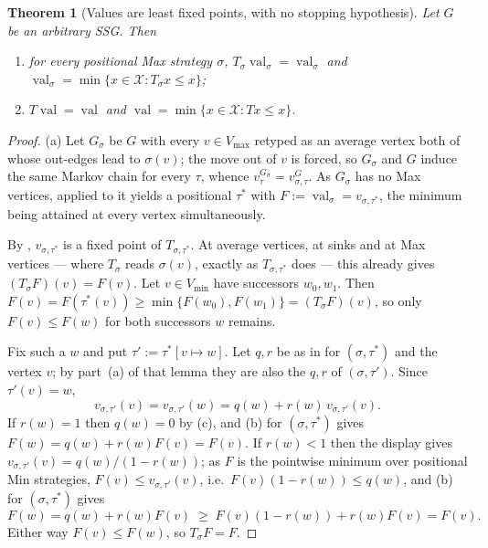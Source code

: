 \documentclass[11pt]{article}
\theoremstyle{plain}
\newtheorem{theorem}{Theorem}[section]
\theoremstyle{definition}
\DeclareMathOperator{\val}{val}
\newcommand{\Vmax}{V_{\max}}
\newcommand{\Vmin}{V_{\min}}
\begin{document}
\begin{theorem}[Values are least fixed points, with no stopping hypothesis]\label{thm:lfp-general}
Let $G$ be an arbitrary SSG. Then
\begin{enumerate}[label=(\alph*),leftmargin=2.2em]
\item for every positional Max strategy $\sigma$,
  $T_\sigma\val_\sigma=\val_\sigma$ and
  $\val_\sigma=\min\{x\in\mathcal{X}:T_\sigma x\le x\}$;
\item $T\val=\val$ and $\val=\min\{x\in\mathcal{X}:Tx\le x\}$.
\end{enumerate}
\end{theorem}

\begin{proof}
(a) Let $G_\sigma$ be $G$ with every $v\in\Vmax$ retyped as an average
vertex both of whose out-edges lead to $\sigma(v)$; the move out of $v$
is forced, so $G_\sigma$ and $G$ induce the same Markov chain for every
$\tau$, whence $v^{G_\sigma}_\tau=v^{G}_{\sigma,\tau}$. As $G_\sigma$ has
no Max vertices,  applied to it yields a positional
$\tau^\ast$ with $F:=\val_\sigma=v_{\sigma,\tau^\ast}$, the minimum being
attained at every vertex simultaneously.

By , $v_{\sigma,\tau^\ast}$ is a fixed point of
$T_{\sigma,\tau^\ast}$. At average vertices, at sinks and at Max vertices
--- where $T_\sigma$ reads $\sigma(v)$, exactly as $T_{\sigma,\tau^\ast}$
does --- this already gives $(T_\sigma F)(v)=F(v)$. Let $v\in\Vmin$ have
successors $w_0,w_1$. Then
$F(v)=F(\tau^\ast(v))\ge\min\{F(w_0),F(w_1)\}=(T_\sigma F)(v)$, so only
$F(v)\le F(w)$ for both successors $w$ remains.

Fix such a $w$ and put $\tau':=\tau^\ast[v\mapsto w]$. Let $q,r$ be as in
 for $(\sigma,\tau^\ast)$ and the vertex $v$; by
part~(a) of that lemma they are also the $q,r$ of $(\sigma,\tau')$. Since
$\tau'(v)=w$,
\[
  v_{\sigma,\tau'}(v)=v_{\sigma,\tau'}(w)=q(w)+r(w)\,v_{\sigma,\tau'}(v).
\]
If $r(w)=1$ then $q(w)=0$ by (c), and
(b) for $(\sigma,\tau^\ast)$ gives
$F(w)=q(w)+r(w)F(v)=F(v)$. If $r(w)<1$ then the display gives
$v_{\sigma,\tau'}(v)=q(w)/(1-r(w))$; as $F$ is the pointwise minimum over
positional Min strategies, $F(v)\le v_{\sigma,\tau'}(v)$, i.e.\
$F(v)(1-r(w))\le q(w)$, and (b) for
$(\sigma,\tau^\ast)$ gives
\[
  F(w)=q(w)+r(w)F(v)\;\ge\;F(v)(1-r(w))+r(w)F(v)=F(v).
\]
Either way $F(v)\le F(w)$, so $T_\sigma F=F$.


\end{proof}
\end{document}
